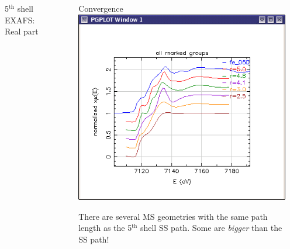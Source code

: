 \documentclass[10pt, xcolor=x11names, compress]{beamer}
\newcommand{\pto}{PbTiO$_3$}
\begin{document}
\begin{frame}
\begin{columns}[T]
\begin{column}{0.4\linewidth}
\begin{center}
        5$^{\mathrm{th}}$ shell EXAFS: Real part
      \end{center}
    \end{column}
    \begin{column}{0.1\linewidth}
      ~
    \end{column}
    \begin{column}{0.4\linewidth}
      \begin{block}{Convergence}
        \includegraphics[width=\linewidth]{images/xanes_convergence}
      \end{block}
      There are several MS geometries with the same path length as the
      5$^{\mathrm{th}}$ shell SS path.  Some are \emph{bigger} than
      the SS path!
    \end{column}
    \begin{column}{0.05\linewidth}
      ~
    \end{column}
  \end{columns}
\end{frame}


\end{document}
